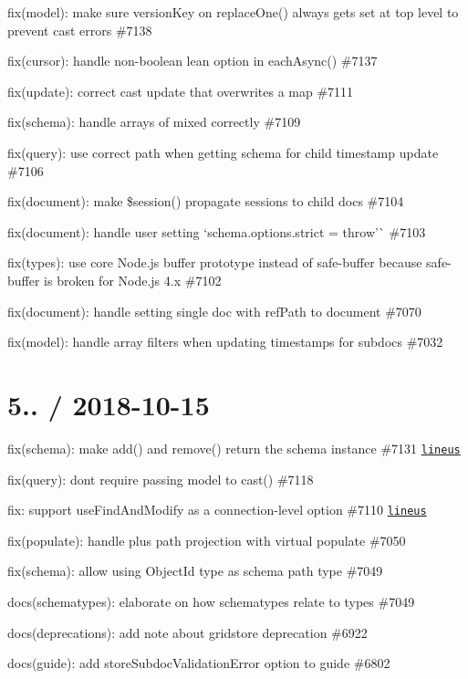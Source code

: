 \begin{DoxyItemize}
\item fix(model)\+: make sure version\+Key on {\ttfamily replace\+One()} always gets set at top level to prevent cast errors \#7138
\item fix(cursor)\+: handle non-\/boolean lean option in {\ttfamily each\+Async()} \#7137
\item fix(update)\+: correct cast update that overwrites a map \#7111
\item fix(schema)\+: handle arrays of mixed correctly \#7109
\item fix(query)\+: use correct path when getting schema for child timestamp update \#7106
\item fix(document)\+: make {\ttfamily \$session()} propagate sessions to child docs \#7104
\item fix(document)\+: handle user setting `schema.\+options.\+strict = \textquotesingle{}throw'\`{} \#7103
\item fix(types)\+: use core Node.\+js buffer prototype instead of safe-\/buffer because safe-\/buffer is broken for Node.\+js 4.\+x \#7102
\item fix(document)\+: handle setting single doc with ref\+Path to document \#7070
\item fix(model)\+: handle array filters when updating timestamps for subdocs \#7032
\end{DoxyItemize}

\section*{5.. / 2018-\/10-\/15 }


\begin{DoxyItemize}
\item fix(schema)\+: make {\ttfamily add()} and {\ttfamily remove()} return the schema instance \#7131 \href{https://github.com/lineus}{\tt lineus}
\item fix(query)\+: don\textquotesingle{}t require passing model to {\ttfamily cast()} \#7118
\item fix\+: support {\ttfamily use\+Find\+And\+Modify} as a connection-\/level option \#7110 \href{https://github.com/lineus}{\tt lineus}
\item fix(populate)\+: handle plus path projection with virtual populate \#7050
\item fix(schema)\+: allow using Object\+Id type as schema path type \#7049
\item docs(schematypes)\+: elaborate on how schematypes relate to types \#7049
\item docs(deprecations)\+: add note about gridstore deprecation \#6922
\item docs(guide)\+: add store\+Subdoc\+Validation\+Error option to guide \#6802
\end{DoxyItemize}

